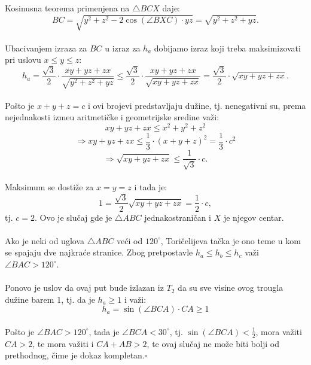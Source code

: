 \documentclass[11pt,letter]{article}
\newcommand{\qed}{\hfill $\square$ \bigskip}
\begin{document}
\indent Kosinusna teorema primenjena na $\bigtriangleup BCX$ daje:
\\
$$BC=\sqrt{y^2+z^2-2\cos{(\angle BXC)}\cdot yz}=\sqrt{y^2+z^2+yz}.$$
\\
\indent Ubacivanjem izraza za $BC$ u izraz za $h_a$ dobijamo izraz koji treba maksimizovati  pri uslovu $x\leqslant y\leqslant z$:
$$h_a=\frac{\sqrt3}{2}\cdot \frac{xy+yz+zx}{\sqrt{y^2+z^2+yz}}\leqslant \frac{\sqrt3}{2}\cdot \frac{xy+yz+zx}{\sqrt{xy+yz+zx}}=\frac{\sqrt3}{2}\cdot \sqrt{xy+yz+zx}.$$
\\
\indent Po\v sto je $x+y+z=c$ i ovi brojevi predstavljaju du\v zine, tj. nenegativni su, prema nejednakosti izme\dj u aritmeti\v cke i geometrijske sredine va\v zi:
$$xy+yz+zx\leqslant x^2+y^2+z^2$$
$$\Longrightarrow xy+yz+zx\leqslant \frac{1}{3}\cdot (x+y+z)^2=\frac{1}{3}\cdot c^2$$
$$\Longrightarrow \sqrt{xy+yz+zx}\leqslant \frac{1}{\sqrt3}\cdot c.$$
\\
\indent Maksimum se dosti\v ze za $x=y=z$ i tada je:
$$1=\frac{\sqrt3}{2}\sqrt{xy+yz+zx}=\frac{1}{2}\cdot c,$$
tj. $c=2$. Ovo je slu\v caj gde je $\bigtriangleup ABC$ jednakostrani\v can i $X$ je njegov centar.
\\
\\
\indent Ako je neki od uglova $\bigtriangleup ABC$ ve\' ci od $120^\circ$, Tori\v celijeva ta\v cka je ono teme u kom se spajaju dve najkra\' ce stranice. Zbog pretpostavle $h_a\leqslant h_b\leqslant h_c$ va\v zi $\angle BAC>120^\circ$.
\\
\\
\indent Ponovo je uslov da ovaj put bude izlazan iz $T_2$ da su sve visine ovog trougla du\v zine barem 1, tj. da je $h_a\geqslant 1$ i va\v zi:
$$h_a=\sin{(\angle BCA)}\cdot CA\geqslant 1$$
\\
\indent Po\v sto je $\angle BAC>120^\circ$, tada je $\angle BCA<30^\circ$, tj. $\sin(\angle BCA)<\frac{1}{2}$, mora va\v ziti $CA>2$, te mora va\v ziti i $CA+AB>2$, te ovaj slu\v caj ne mo\v ze biti bolji od prethodnog, \v cime je dokaz kompletan.\qed
\\
\end{document}
